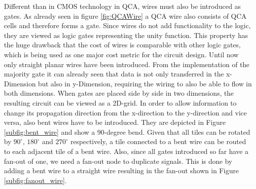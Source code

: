 Different than in CMOS technology in QCA, wires must also be introduced as gates. As already seen in figure \ref{fig:QCAWire} a QCA wire also consists of QCA cells and therefore forms a gate. Since wires do not add functionality to the logic, they are viewed as logic gates representing the unity function. This property has the huge drawback that the cost of wires is comparable with other logic gates, which is being used as one major cost metric for the circuit design. Until now only straight planar wires have been introduced. From the implementation of the majority gate it can already seen that data is not only transferred in the x-Dimension but also in y-Dimension, requiring the wiring to also be able to flow in both dimensions. When gates are placed side by side in two dimensions, the resulting circuit can be viewed as a 2D-grid. In order to allow information to change its propagation direction from the x-direction to the y-direction and vice versa, also bent wires have to be introduced. They are depicted in Figure \ref{subfig:bent_wire} and show a 90-degree bend. Given that all tiles can be rotated by $90^{\circ}$, $180^{\circ}$ and $270^{\circ}$ respectively, a tile connected to a bent wire can be routed to each adjacent tile of a bent wire. Also, since all gates introduced so far have a fan-out of one, we need a fan-out node to duplicate signals. This is done by adding a bent wire to a straight wire resulting in the fan-out shown in Figure \ref{subfig:fanout_wire}.\\
